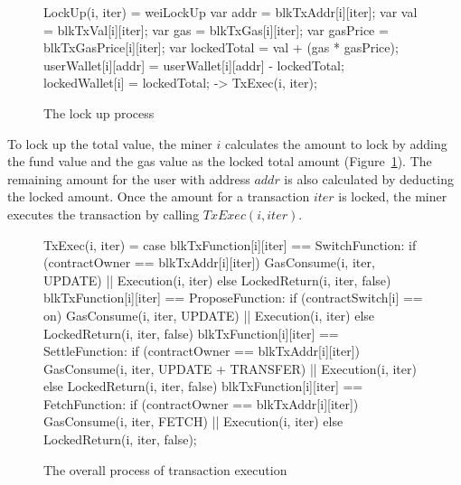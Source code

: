 \documentclass{KERauth}
\begin{document}
\begin{figure}[h]
\begin{center}
\begin{boxedverbatim}
LockUp(i, iter) = 
  weiLockUp{
    var addr = blkTxAddr[i][iter];
    var val = blkTxVal[i][iter];
    var gas = blkTxGas[i][iter];
    var gasPrice = blkTxGasPrice[i][iter];
    var lockedTotal = val + (gas * gasPrice);
    userWallet[i][addr] = userWallet[i][addr] - lockedTotal;
    lockedWallet[i] = lockedTotal;} ->
  TxExec(i, iter);
\end{boxedverbatim}
\end{center}
\caption{The lock up process}\label{fig:lockup}
\end{figure}

To lock up the total value, the miner $i$ calculates the amount to lock by adding the fund value and the gas value as the locked total amount (Figure~\ref{fig:lockup}). The remaining amount for the user with address $addr$ is also calculated by deducting the locked amount. Once the amount for a transaction $iter$ is locked, the miner executes the transaction by calling $TxExec(i, iter)$.

\begin{figure}[h]
\begin{center}
\begin{boxedverbatim}
TxExec(i, iter) = 
  case {
    blkTxFunction[i][iter] == SwitchFunction:
      if (contractOwner == blkTxAddr[i][iter]) { 
        GasConsume(i, iter, UPDATE) || Execution(i, iter)} 
      else { LockedReturn(i, iter, false) }
    blkTxFunction[i][iter] == ProposeFunction:
      if (contractSwitch[i] == on) {
        GasConsume(i, iter, UPDATE) || Execution(i, iter)}
      else {LockedReturn(i, iter, false)}
    blkTxFunction[i][iter] == SettleFunction:
      if (contractOwner == blkTxAddr[i][iter]) {
        GasConsume(i, iter, UPDATE + TRANSFER) || Execution(i, iter)} 
      else {LockedReturn(i, iter, false)}
    blkTxFunction[i][iter] == FetchFunction:
      if (contractOwner == blkTxAddr[i][iter]) {
        GasConsume(i, iter, FETCH) || Execution(i, iter)}
      else {LockedReturn(i, iter, false)}};
\end{boxedverbatim}
\end{center}
\caption{The overall process of transaction execution}\label{fig:txexec}
\end{figure}
\end{document}
